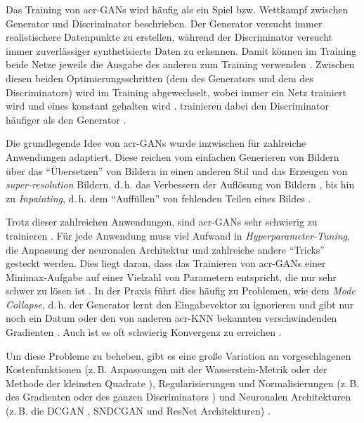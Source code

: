 Das Training von \gls{acr-GAN}s wird häufig als ein Spiel bzw. Wettkampf
zwischen Generator und Discriminator beschrieben.
Der Generator versucht immer realistischere Datenpunkte
zu erstellen, während der Discriminator versucht immer zuverlässiger
synthetisierte Daten zu erkennen. Damit können im Training beide Netze jeweils
die Ausgabe des anderen zum Training verwenden \cite[S. 625]{raschka2019}.
Zwischen diesen beiden Optimierungsschritten (dem des Generators und dem des
Discriminators) wird im Training abgewechselt, wobei immer ein Netz trainiert
wird und eines konstant gehalten wird \cite[S. 626]{raschka2019}. 
trainieren dabei den Discriminator häufiger als den Generator \cite[S.
3]{goodfellow2014generative}.

Die grundlegende Idee von \gls{acr-GAN}s wurde inzwischen für zahlreiche
Anwendungen adaptiert. Diese reichen vom einfachen Generieren von Bildern
\cite{goodfellow2014generative, arjovsky2017wasserstein,
gulrajani2017improved,kurach2018gan, miyato2018spectral} über das \enquote{Übersetzen}
von Bildern in einen anderen Stil
\cite{pang2021image,isola2017image,zhu2017unpaired,
liu2019few,saito2020coco,anokhin2020high} und das Erzeugen von
\emph{super-resolution} Bildern, d.\,h. das Verbessern der Auflösung von Bildern
\cite{pang2021image,anokhin2020high,ledig2017photo}, bis hin zu
\emph{Inpainting}, d.\,h. dem \enquote{Auffüllen} von fehlenden Teilen eines Bildes
\cite{pang2021image,isola2017image, demir2018patch}.

Trotz dieser zahlreichen Anwendungen, sind \gls{acr-GAN}s sehr schwierig zu
trainieren \cite[S. 1]{kurach2018gan}. Für jede Anwendung muss viel Aufwand in
\emph{Hyperparameter-Tuning}, die Anpassung der neuronalen Architektur und
zahlreiche andere \enquote{Tricks} \cite[vgl.][]{kurach2018gan} gesteckt werden. Dies
liegt daran, dass das Trainieren von \gls{acr-GAN}s einer
Minimax-Aufgabe auf einer Vielzahl von Parametern entspricht, die nur sehr
schwer zu lösen ist \cite[S. 1]{kurach2018gan}. In der Praxis führt dies häufig
zu Problemen, wie dem \emph{Mode Collapse}, d.\,h. der Generator lernt den
Eingabevektor zu ignorieren und gibt nur noch ein Datum \cite[S.
4]{pang2021image} oder den von anderen \gls{acr-KNN} bekannten verschwindenden
Gradienten \cite[S. 6]{arjovsky2017towards}. Auch ist es oft schwierig
Konvergenz zu erreichen \cite[S. 4]{pang2021image}.

Um diese Probleme zu beheben, gibt es eine große Variation an vorgeschlagenen
Kostenfunktionen (z.\,B. Anpassungen mit der Wasserstein-Metrik
\cite{arjovsky2017wasserstein} oder der Methode der kleinsten Quadrate \cite[S.
2]{kurach2018gan}), Regularisierungen und Normalisierungen (z.\,B. des
Gradienten oder des ganzen Discriminators \cite[S. 2f.]{kurach2018gan}) und 
Neuronalen Architekturen (z.\,B. die DCGAN \cite{radford2015unsupervised},
SNDCGAN \cite{miyato2018spectral} und ResNet \cite{zhu2017unpaired}
Architekturen) \cite[vgl.][S. 1,3]{kurach2018gan}.

